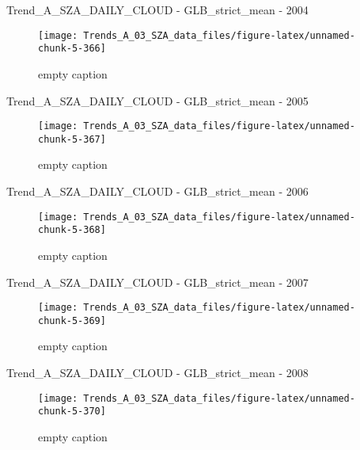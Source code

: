\documentclass[
  10pt,
  a4paper,oneside]{article}
\begin{document}
Trend\_A\_SZA\_DAILY\_CLOUD - GLB\_strict\_mean - 2004

\begin{figure}[!ht]

{\centering \texttt{[image: Trends\_A\_03\_SZA\_data\_files/figure-latex/unnamed-chunk-5-366]} 

}

\caption{ empty caption }\label{fig:unnamed-chunk-5-366}
\end{figure}

Trend\_A\_SZA\_DAILY\_CLOUD - GLB\_strict\_mean - 2005

\begin{figure}[!ht]

{\centering \texttt{[image: Trends\_A\_03\_SZA\_data\_files/figure-latex/unnamed-chunk-5-367]} 

}

\caption{ empty caption }\label{fig:unnamed-chunk-5-367}
\end{figure}

Trend\_A\_SZA\_DAILY\_CLOUD - GLB\_strict\_mean - 2006

\begin{figure}[!ht]

{\centering \texttt{[image: Trends\_A\_03\_SZA\_data\_files/figure-latex/unnamed-chunk-5-368]} 

}

\caption{ empty caption }\label{fig:unnamed-chunk-5-368}
\end{figure}

Trend\_A\_SZA\_DAILY\_CLOUD - GLB\_strict\_mean - 2007

\begin{figure}[!ht]

{\centering \texttt{[image: Trends\_A\_03\_SZA\_data\_files/figure-latex/unnamed-chunk-5-369]} 

}

\caption{ empty caption }\label{fig:unnamed-chunk-5-369}
\end{figure}

Trend\_A\_SZA\_DAILY\_CLOUD - GLB\_strict\_mean - 2008

\begin{figure}[!ht]

{\centering \texttt{[image: Trends\_A\_03\_SZA\_data\_files/figure-latex/unnamed-chunk-5-370]} 

}

\caption{ empty caption }\label{fig:unnamed-chunk-5-370}
\end{figure}
\end{document}
